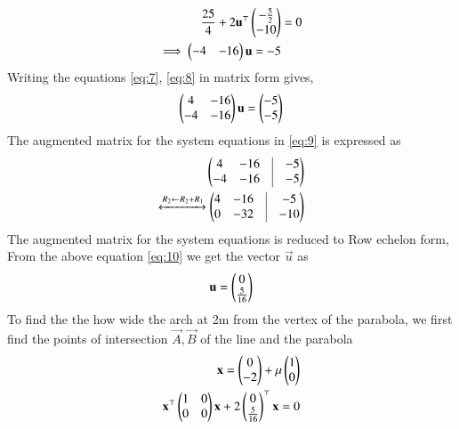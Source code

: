 \documentclass[journal,12pt,twocolumn]{IEEEtran}
\begin{document}
\begin{enumerate}
\begin{align}
\frac{25}{4} + 2\mathbf{u}^\top \begin{pmatrix}-\frac{5}{2}\\ -10\end{pmatrix} &= 0\\
\implies \begin{pmatrix}-4&-16\end{pmatrix}\mathbf{u} = -5\label{eq:8}
\end{align}
Writing the equations \eqref{eq:7}, \eqref{eq:8} in matrix form gives,
\begin{align}
\begin{pmatrix}4&-16\\-4&-16\end{pmatrix}\mathbf{u} = \begin{pmatrix}-5\\-5\end{pmatrix}\label{eq:9}
\end{align}
The augmented matrix for the system equations in \eqref{eq:9} is expressed as
\begin{align}
	\myvec{4&-16&\vrule&-5\\ -4&-16&\vrule&-5} \\
	\xleftrightarrow[]{R_2\leftarrow R_2+R_1}
	\myvec{4&-16&\vrule&-5\\ 0&-32&\vrule&-10} \label{eq:10}
\end{align}
The augmented matrix for the system equations is reduced to Row echelon form, From the above equation \eqref{eq:10} we get the vector $\vec{u}$ as
\begin{align}
\mathbf{u} = \begin{pmatrix}0\\\frac{5}{16}\end{pmatrix}
\end{align}
To find the the how wide the arch at 2m from the vertex of the parabola, we first find the points of intersection $\vec{A}, \vec{B}$ of the line and the parabola 
\begin{align}
\mathbf{x} = \begin{pmatrix}0\\-2\end{pmatrix} + \mu \begin{pmatrix}1\\0\end{pmatrix} \label{eq:11}\\
\mathbf{x}^\top \begin{pmatrix}1&0\\0&0\end{pmatrix}\mathbf{x} + 2\begin{pmatrix}0\\\frac{5}{16}\end{pmatrix}^\top \mathbf{x}= 0\label{eq:12}
\end{align}


\end{enumerate}
\end{document}
